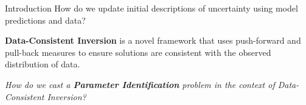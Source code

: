 \begin{block}{Introduction}
\centering
            {\large How do we update initial descriptions of uncertainty using model predictions and data?}

             {\large \textbf{Data-Consistent Inversion} is a novel framework that uses push-forward and pull-back measures to ensure solutions are consistent with the observed distribution of data.}

             {\large \emph{How do we cast a \textbf{Parameter Identification} problem in the context of Data-Consistent Inversion?} }

\end{block}

